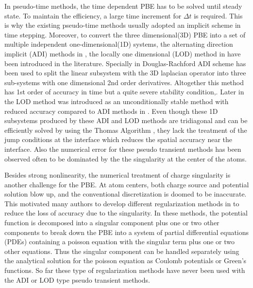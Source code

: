 In pseudo-time methods, the time dependent PBE has to be solved until steady state. To maintain the efficiency, a large time increment for  $\Delta t$ is required. This is why the existing pseudo-time methods usually adopted an implicit scheme in time stepping. Moreover, to convert the three dimensional(3D) PBE into a set of multiple independent one-dimensional(1D) systems, the alternating direction implicit (ADI) methods in \cite{Geng2013_tree,Geng2013_Fully}, the locally one dimensional (LOD) method in \cite{Wilson2016} have been introduced in the literature. Specially in \cite{Geng2013_Fully} Douglas-Rachford ADI scheme has been used to split the linear subsystem with the 3D laplacian operator into three sub-systems with one dimensional 2nd order derivatives. Altogether this method has 1st order of accuracy in time but a quite severe stability condition,. Later in \cite{Wilson2016} the LOD method was introduced as an unconditionally stable method with reduced accuracy compared to ADI methods in \cite{Geng2013_Fully}. Even though these 1D subsystems produced by these ADI and LOD methods are tridiagonal and can be efficiently solved by using the Thomas Algorithm \cite{FD_PDE}, they lack the treatment of the jump conditions at the interface which reduces the spatial accuracy near the interface. Also the numerical error for these pseudo transient methods has been observed often to be dominated by the the singularity at the center of the atoms.

Besides strong nonlinearity, the numerical treatment of charge singularity is another challenge for the PBE. At atom centers, both charge source and potential solution blow up, and the conventional discretization is doomed to be inaccurate. This motivated many authors to develop different regularization methods in \cite{Cai2009,Chen2007, Geng2007,Holst2010,XIE2014,Zhou_1996,Geng2017a} to reduce the loss of accuracy due to the singularity. In these methods, the potential function is decomposed into a singular component plus one or two other components to break down the PBE into a system of partial differential equations (PDEs) containing a poisson equation with the singular term plus one or two other equations. Thus the singular component can be handled separately using the analytical solution for the poisson equation as Coulomb potentials or Green's functions. So far these type of regularization methods have never been used with the ADI or LOD type pseudo transient methods. 

